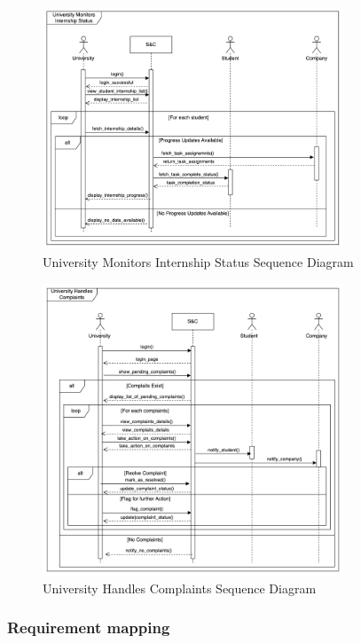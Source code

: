 \begin{figure}[H]
\centering
\includegraphics[width=0.8\textwidth]{Images/University_Monitor_Status_Sequence_Diagram.png}
\caption{\label{fig:metamodel9}University Monitors Internship Status Sequence Diagram}
\end{figure}

\begin{figure}[H]
\centering
\includegraphics[width=0.8\textwidth]{Images/University_Handles_Complaints_Sequence_Diagram.png}
\caption{\label{fig:metamodel9}University Handles Complaints Sequence Diagram}
\end{figure}


\subsubsection{Requirement mapping}



